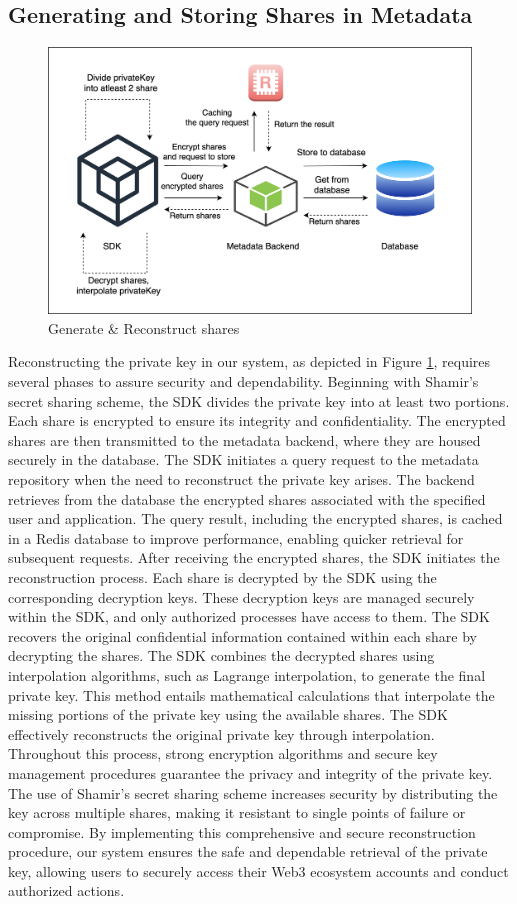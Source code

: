 \documentclass[../Main.tex]{subfiles}
\begin{document}
\subsection{Generating and Storing Shares in Metadata}
\begin{figure}[H]
 \centering
 \includegraphics[scale=0.14]{Figure/generate-share.png}
 \caption{Generate & Reconstruct shares}
    \label{fig:generate-share}
\end{figure}
Reconstructing the private key in our system, as depicted in Figure \ref{fig:generate-share}, requires several phases to assure security and dependability. Beginning with Shamir's secret sharing scheme, the SDK divides the private key into at least two portions. Each share is encrypted to ensure its integrity and confidentiality. The encrypted shares are then transmitted to the metadata backend, where they are housed securely in the database. The SDK initiates a query request to the metadata repository when the need to reconstruct the private key arises. The backend retrieves from the database the encrypted shares associated with the specified user and application. The query result, including the encrypted shares, is cached in a Redis database to improve performance, enabling quicker retrieval for subsequent requests. After receiving the encrypted shares, the SDK initiates the reconstruction process. Each share is decrypted by the SDK using the corresponding decryption keys. These decryption keys are managed securely within the SDK, and only authorized processes have access to them. The SDK recovers the original confidential information contained within each share by decrypting the shares. The SDK combines the decrypted shares using interpolation algorithms, such as Lagrange interpolation, to generate the final private key. This method entails mathematical calculations that interpolate the missing portions of the private key using the available shares. The SDK effectively reconstructs the original private key through interpolation. Throughout this process, strong encryption algorithms and secure key management procedures guarantee the privacy and integrity of the private key. The use of Shamir's secret sharing scheme increases security by distributing the key across multiple shares, making it resistant to single points of failure or compromise. By implementing this comprehensive and secure reconstruction procedure, our system ensures the safe and dependable retrieval of the private key, allowing users to securely access their Web3 ecosystem accounts and conduct authorized actions.
\end{document}
